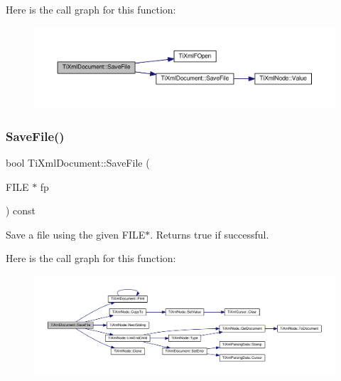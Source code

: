Here is the call graph for this function\+:\nopagebreak
\begin{figure}[H]
\begin{center}
\leavevmode
\includegraphics[width=350pt]{class_ti_xml_document_ae641f33784381017c44e107cc2c86b5c_cgraph}
\end{center}
\end{figure}
\mbox{\label{class_ti_xml_document_a8f5a1022168a5767e32becec7b6f44ee}} 
\subsubsection{\texorpdfstring{Save\+File()}{SaveFile()}\hspace{0.1cm}{\footnotesize\ttfamily [3/3]}}
{\footnotesize\ttfamily bool Ti\+Xml\+Document\+::\+Save\+File (\begin{DoxyParamCaption}\item[{F\+I\+LE $\ast$}]{fp }\end{DoxyParamCaption}) const}



Save a file using the given F\+I\+L\+E$\ast$. Returns true if successful. 

Here is the call graph for this function\+:\nopagebreak
\begin{figure}[H]
\begin{center}
\leavevmode
\includegraphics[width=350pt]{class_ti_xml_document_a8f5a1022168a5767e32becec7b6f44ee_cgraph}
\end{center}
\end{figure}
\mbox{\label{class_ti_xml_document_a735c23e318597b920c94eae77fa206de}} 
